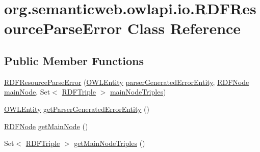 \hypertarget{classorg_1_1semanticweb_1_1owlapi_1_1io_1_1_r_d_f_resource_parse_error}{\section{org.\-semanticweb.\-owlapi.\-io.\-R\-D\-F\-Resource\-Parse\-Error Class Reference}
\label{classorg_1_1semanticweb_1_1owlapi_1_1io_1_1_r_d_f_resource_parse_error}
}
\subsection*{Public Member Functions}
\begin{DoxyCompactItemize}
\item 
\hyperlink{classorg_1_1semanticweb_1_1owlapi_1_1io_1_1_r_d_f_resource_parse_error_aa19edcb5d87a28c8bdcd418beac329aa}{R\-D\-F\-Resource\-Parse\-Error} (\hyperlink{interfaceorg_1_1semanticweb_1_1owlapi_1_1model_1_1_o_w_l_entity}{O\-W\-L\-Entity} \hyperlink{classorg_1_1semanticweb_1_1owlapi_1_1io_1_1_r_d_f_resource_parse_error_aa023431539ae6f94f2891d39069b9077}{parser\-Generated\-Error\-Entity}, \hyperlink{classorg_1_1semanticweb_1_1owlapi_1_1io_1_1_r_d_f_node}{R\-D\-F\-Node} \hyperlink{classorg_1_1semanticweb_1_1owlapi_1_1io_1_1_r_d_f_resource_parse_error_a3a96338edbf7db4580077db253b53d8a}{main\-Node}, Set$<$ \hyperlink{classorg_1_1semanticweb_1_1owlapi_1_1io_1_1_r_d_f_triple}{R\-D\-F\-Triple} $>$ \hyperlink{classorg_1_1semanticweb_1_1owlapi_1_1io_1_1_r_d_f_resource_parse_error_a97dde1a706753351cb7df4522ba3203c}{main\-Node\-Triples})
\item 
\hyperlink{interfaceorg_1_1semanticweb_1_1owlapi_1_1model_1_1_o_w_l_entity}{O\-W\-L\-Entity} \hyperlink{classorg_1_1semanticweb_1_1owlapi_1_1io_1_1_r_d_f_resource_parse_error_a10190500cb1bf3de5c7d051471956e8d}{get\-Parser\-Generated\-Error\-Entity} ()
\item 
\hyperlink{classorg_1_1semanticweb_1_1owlapi_1_1io_1_1_r_d_f_node}{R\-D\-F\-Node} \hyperlink{classorg_1_1semanticweb_1_1owlapi_1_1io_1_1_r_d_f_resource_parse_error_a4bdcd7e09e46c927c55e54dc328cb4d3}{get\-Main\-Node} ()
\item 
Set$<$ \hyperlink{classorg_1_1semanticweb_1_1owlapi_1_1io_1_1_r_d_f_triple}{R\-D\-F\-Triple} $>$ \hyperlink{classorg_1_1semanticweb_1_1owlapi_1_1io_1_1_r_d_f_resource_parse_error_acbef760ebee35352e9cee5ee1e726907}{get\-Main\-Node\-Triples} ()
\end{DoxyCompactItemize}
